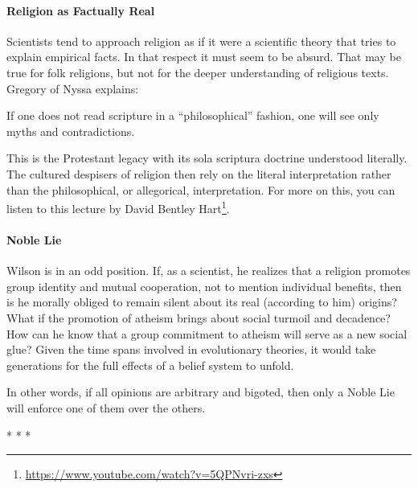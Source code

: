 \paragraph{Religion as Factually Real}


Scientists tend to approach religion as if it were a scientific theory that tries to explain empirical facts. In that respect it must seem to be absurd. That may be true for folk religions, but not for the deeper understanding of religious texts. Gregory of Nyssa explains:

\begin{quotex}
If one does not read scripture in a ``philosophical'' fashion, one will see only myths and contradictions.
\end{quotex}


This is the Protestant legacy with its sola scriptura doctrine understood literally. The cultured despisers of religion then rely on the literal interpretation rather than the philosophical, or allegorical, interpretation. For more on this, you can listen to this lecture by David Bentley Hart\footnote{\url{https://www.youtube.com/watch?v=5QPNvri-zxs}}.

\paragraph{Noble Lie}


Wilson is in an odd position. If, as a scientist, he realizes that a religion promotes group identity and mutual cooperation, not to mention individual benefits, then is he morally obliged to remain silent about its real (according to him) origins? What if the promotion of atheism brings about social turmoil and decadence? How can he know that a group commitment to atheism will serve as a new social glue? Given the time spans involved in evolutionary theories, it would take generations for the full effects of a belief system to unfold.

In other words, if all opinions are arbitrary and bigoted, then only a Noble Lie will enforce one of them over the others.


\begin{center}* * *\end{center}

